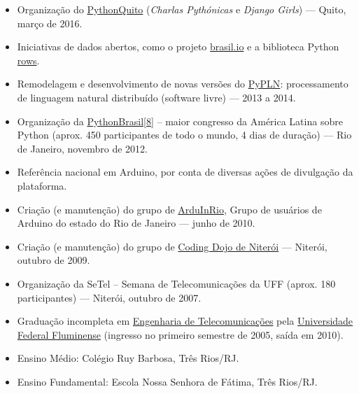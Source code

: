 \documentclass[a4paper,11pt]{article}
\begin{document}
	\begin{itemize}
		\item Organização do \href{http://pythonquito.tk}{PythonQuito}
			(\textit{Charlas Pythónicas} e \textit{Django Girls}) --- Quito,
			março de 2016.
		\item Iniciativas de dados abertos, como o projeto
			\href{http://brasil.io/}{brasil.io} e a
			biblioteca Python \href{https://github.com/turicas/rows}{rows}.
		\item Remodelagem e desenvolvimento de novas versões do
			\href{http://pypln.org/}{PyPLN}: processamento de linguagem natural
			distribuído (software livre) --- 2013 a 2014.
		\item Organização da
			\href{http://2012.pythonbrasil.org.br/}{PythonBrasil[8]} --
			maior congresso da América Latina sobre Python (aprox. 450
			participantes de todo o mundo, 4 dias de duração) --- Rio de
			Janeiro, novembro de 2012.
		\item Referência nacional em Arduino, por conta de diversas ações de
			divulgação da plataforma.
		\item Criação (e manutenção) do grupo de
			\href{https://groups.google.com/forum/#!forum/arduinrio}{ArduInRio},
			Grupo de usuários de Arduino do estado do Rio de Janeiro --- junho
			de 2010.
		\item Criação (e manutenção) do grupo de
			\href{http://dojorio.org}{Coding Dojo de Niterói} --- Niterói,
			outubro de 2009.
		\item Organização da SeTel -- Semana de Telecomunicações da UFF
			(aprox. 180 participantes) --- Niterói, outubro de 2007.
	 \end{itemize}


	\begin{itemize}
		\item Graduação incompleta em \href{http://telecom.uff.br/}{Engenharia
			de Telecomunicações} pela \href{http://www.uff.br/}{Universidade
			Federal Fluminense} (ingresso no primeiro semestre de 2005, saída
			em 2010).
		\item Ensino Médio: Colégio Ruy Barbosa, Três Rios/RJ.
		\item Ensino Fundamental: Escola Nossa Senhora de Fátima, Três Rios/RJ.
	 \end{itemize}
\end{document}
